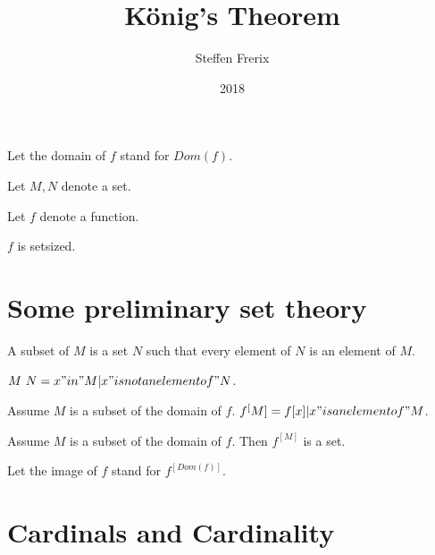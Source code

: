 \documentclass{article}
\title{König's Theorem}
\author{Steffen Frerix}
\date{2018}
\begin{document}

  \maketitle

  \begin{forthel}

    Let the domain of $f$ stand for $Dom(f)$.

    Let $M,N$ denote a set.

    Let $f$ denote a function.
    \begin{axiom}
      $f$ is setsized.
    \end{axiom}
  \end{forthel}


  \section*{Some preliminary set theory}

  \begin{forthel}
    \begin{definition}
      A subset of $M$ is a set $N$ such that every element of $N$ is an element of $M$.
    \end{definition}

    \begin{definition}
      $M \ N = {x "in" M | x "is not an element of" N}$.
    \end{definition}

    \begin{definition}
      Assume $M$ is a subset of the domain of $f$. $f^[M] = {f[x] | x "is an element of" M}$.
    \end{definition}

    \begin{axiom}
      Assume $M$ is a subset of the domain of $f$. Then $f^[M]$ is a set.
    \end{axiom}

    Let the image of $f$ stand for $f^[Dom(f)]$.
  \end{forthel}


  \section*{Cardinals and Cardinality}
\end{document}
